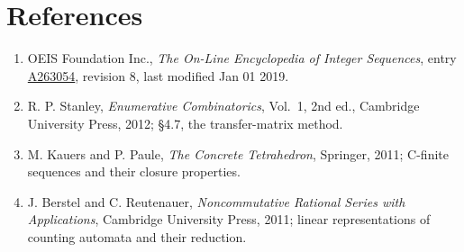 \documentclass[11pt]{article}
\theoremstyle{definition}
\begin{document}
\section{References}

\begin{enumerate}

\item OEIS Foundation Inc., \emph{The On-Line Encyclopedia of Integer Sequences}, entry \href{https://oeis.org/A263054}{A263054}, revision 8, last modified Jan 01 2019.

\item R. P. Stanley, \emph{Enumerative Combinatorics}, Vol.~1, 2nd ed., Cambridge University Press, 2012; \S4.7, the transfer-matrix method.

\item M. Kauers and P. Paule, \emph{The Concrete Tetrahedron}, Springer, 2011; C-finite sequences and their closure properties.

\item J. Berstel and C. Reutenauer, \emph{Noncommutative Rational Series with Applications}, Cambridge University Press, 2011; linear representations of counting automata and their reduction.

\end{enumerate}
\end{document}
